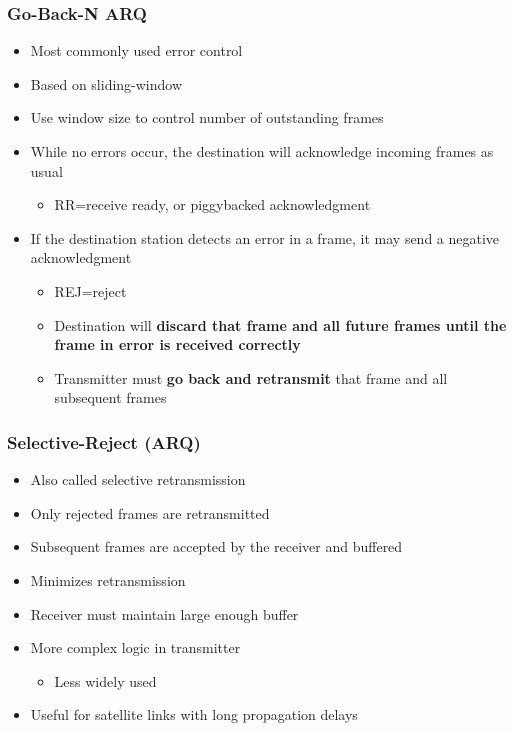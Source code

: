 \documentclass[pdflatex,compress]{beamer}
\begin{document}
\begin{frame}
	\frametitle{Go-Back-N ARQ}
	\begin{itemize}
		\item Most commonly used error control
		\item Based on sliding-window
		\item Use window size to control number of outstanding frames
		\item While no errors occur, the destination will acknowledge incoming frames as usual
		\begin{itemize}
			\item RR=receive ready, or piggybacked acknowledgment
		\end{itemize}
		\item If the destination station detects an error in a frame, it may send a negative acknowledgment
		\begin{itemize}
			\item REJ=reject
			\item Destination will \textbf{discard that frame and all future frames until the frame in error is received correctly}
			\item Transmitter must \textbf{go back and retransmit} that frame and all subsequent frames
		\end{itemize}
	\end{itemize}
\end{frame}

\begin{frame}
	\frametitle{Selective-Reject (ARQ)}
	\begin{itemize}
		\item Also called selective retransmission
		\item Only rejected frames are retransmitted
		\item Subsequent frames are accepted by the receiver and buffered
		\item Minimizes retransmission
		\item Receiver must maintain large enough buffer
		\item More complex logic in transmitter
		\begin{itemize}
			\item Less widely used
		\end{itemize}
		\item Useful for satellite links with long propagation
		delays
	\end{itemize}
\end{frame}
\end{document}
